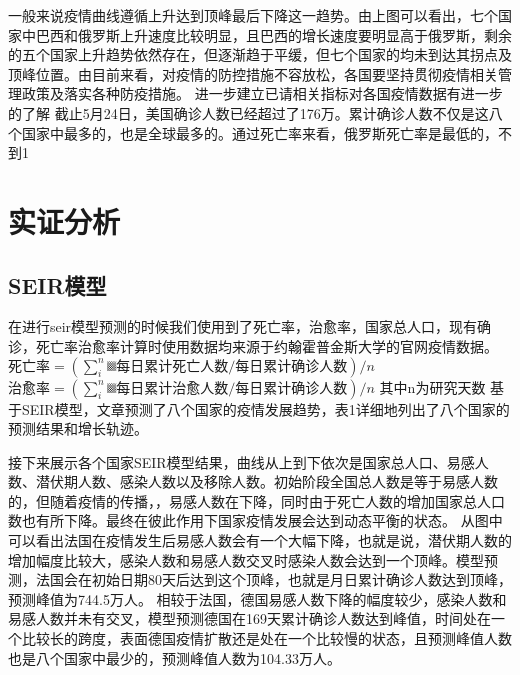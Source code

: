 \documentclass[lang=cn,11pt,a4paper,cite=authoryear]{elegantpaper}
\begin{document}
一般来说疫情曲线遵循上升达到顶峰最后下降这一趋势。由上图可以看出，七个国家中巴西和俄罗斯上升速度比较明显，且巴西的增长速度要明显高于俄罗斯，剩余的五个国家上升趋势依然存在，但逐渐趋于平缓，但七个国家的均未到达其拐点及顶峰位置。由目前来看，对疫情的防控措施不容放松，各国要坚持贯彻疫情相关管理政策及落实各种防疫措施。
进一步建立已请相关指标对各国疫情数据有进一步的了解
截止5月24日，美国确诊人数已经超过了176万。累计确诊人数不仅是这八个国家中最多的，也是全球最多的。通过死亡率来看，俄罗斯死亡率是最低的，不到1%
\section{实证分析}

\subsection{SEIR模型}
在进行seir模型预测的时候我们使用到了死亡率，治愈率，国家总人口，现有确诊，死亡率治愈率计算时使用数据均来源于约翰霍普金斯大学的官网疫情数据。
$死亡率=(∑_i^n▒每日累计死亡人数/每日累计确诊人数)/n$
$治愈率=(∑_i^n▒每日累计治愈人数/每日累计确诊人数)/n$
其中n为研究天数
基于SEIR模型，文章预测了八个国家的疫情发展趋势，表1详细地列出了八个国家的预测结果和增长轨迹。

接下来展示各个国家SEIR模型结果，曲线从上到下依次是国家总人口、易感人数、潜伏期人数、感染人数以及移除人数。初始阶段全国总人数是等于易感人数的，但随着疫情的传播，，易感人数在下降，同时由于死亡人数的增加国家总人口数也有所下降。最终在彼此作用下国家疫情发展会达到动态平衡的状态。
从图中可以看出法国在疫情发生后易感人数会有一个大幅下降，也就是说，潜伏期人数的增加幅度比较大，感染人数和易感人数交叉时感染人数会达到一个顶峰。模型预测，法国会在初始日期80天后达到这个顶峰，也就是月日累计确诊人数达到顶峰，预测峰值为744.5万人。
相较于法国，德国易感人数下降的幅度较少，感染人数和易感人数并未有交叉，模型预测德国在169天累计确诊人数达到峰值，时间处在一个比较长的跨度，表面德国疫情扩散还是处在一个比较慢的状态，且预测峰值人数也是八个国家中最少的，预测峰值人数为104.33万人。
\end{document}
